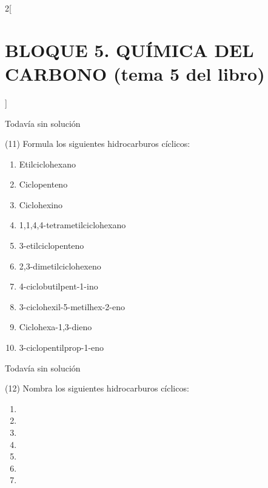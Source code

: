 \documentclass[10pt]{article}
\begin{document}
\begin{multicols}{2}[
  \section{BLOQUE 5. QUÍMICA DEL CARBONO (tema 5 del libro)}
  ]
\begin{solution}[print=false]
  Todavía sin solución
\end{solution}




\begin{exercise}[
    tags    = {},
    topics  = {química,química básica},
    source  = {FQ 1B MGH 2016, p85, e26},
  ]

  (11) Formula los siguientes hidrocarburos cíclicos:
  \begin{enumerate}
    \item Etilciclohexano
    \item Ciclopenteno
    \item Ciclohexino
    \item 1,1,4,4-tetrametilciclohexano
    \item 3-etilciclopenteno
    \item 2,3-dimetilciclohexeno
    \item 4-ciclobutilpent-1-ino
    \item 3-ciclohexil-5-metilhex-2-eno
    \item Ciclohexa-1,3-dieno
    \item 3-ciclopentilprop-1-eno
  \end{enumerate}
\end{exercise}

\begin{solution}[print=false]
  Todavía sin solución
\end{solution}




\begin{exercise}[
    tags    = {},
    topics  = {química,química básica},
    source  = {FQ 1B MGH 2016, p85, e26},
  ]

  (12) Nombra los siguientes hidrocarburos cíclicos:
  \begin{enumerate}
    \item {}
    \item {}
    \item {}
    \item {}
    \item {}
    \item {}
    \item {}
  \end{enumerate}
\end{exercise}


\end{multicols}
\end{document}
